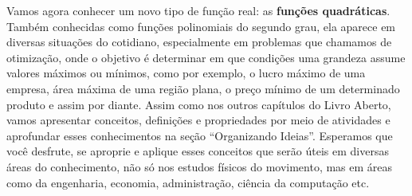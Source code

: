 \mainmatter


\label{\detokenize{AF209-0:sec-funcao-quadratica-movimento-com-velocidade-variavel-queda-vertical}}\label{\detokenize{AF209-0::doc}}\label{\detokenize{AF209-0:explorando-movimentos-com-velocidade-variavel}}\label{\detokenize{AF209-0:ativ-funcao-quadratica-lancamento-vertical-em-dubai}}

Vamos agora conhecer um novo tipo de função real: as \textbf{funções quadráticas}. Também conhecidas como funções polinomiais do segundo grau, ela aparece em diversas situações do cotidiano, especialmente em problemas que chamamos de otimização, onde o objetivo é determinar em que condições uma grandeza assume valores máximos ou mínimos, como por exemplo, o lucro máximo de uma empresa, área máxima de uma região plana, o preço mínimo de um determinado produto e assim por diante. Assim como nos outros capítulos do Livro Aberto, vamos apresentar conceitos, definições e propriedades por meio de atividades e aprofundar esses conhecimentos na seção “Organizando Ideias”. Esperamos que você desfrute, se aproprie e aplique esses conceitos que serão úteis em diversas áreas do conhecimento, não só nos estudos físicos do movimento, mas em áreas como da engenharia, economia, administração, ciência da computação etc.

